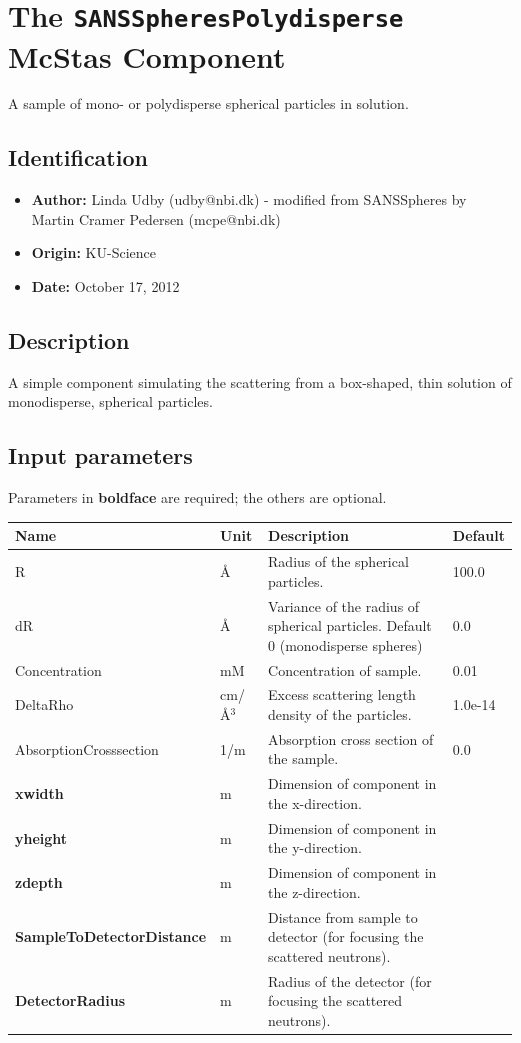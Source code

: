 \section{The \texttt{SANSSpheresPolydisperse} McStas Component}
A sample of mono- or polydisperse spherical particles in solution.

\subsection*{Identification}
\begin{itemize}
  \item \textbf{Author:} Linda Udby (udby@nbi.dk) - modified from SANSSpheres by Martin Cramer Pedersen (mcpe@nbi.dk)
  \item \textbf{Origin:} KU-Science
  \item \textbf{Date:} October 17, 2012
\end{itemize}

\subsection*{Description}
A simple component simulating the scattering from a box-shaped, thin solution of monodisperse, spherical particles.

\subsection*{Input parameters}
Parameters in \textbf{boldface} are required; the others are optional.

\begin{longtable}{p{}p{}p{}p{}}
\toprule
\textbf{Name} & \textbf{Unit} & \textbf{Description} & \textbf{Default} \\
\midrule
\endhead
R & \AA{} & Radius of the spherical particles. & 100.0 \\
dR & \AA{} & Variance of the radius of spherical particles. Default 0 (monodisperse spheres) & 0.0 \\
Concentration & mM & Concentration of sample. & 0.01 \\
DeltaRho & cm/\AA{}$^{3}$ & Excess scattering length density of the particles. & 1.0e-14 \\
AbsorptionCrosssection & 1/m & Absorption cross section of the sample. & 0.0 \\
\textbf{xwidth} & m & Dimension of component in the x-direction. &  \\
\textbf{yheight} & m & Dimension of component in the y-direction. &  \\
\textbf{zdepth} & m & Dimension of component in the z-direction. &  \\
\textbf{SampleToDetectorDistance} & m & Distance from sample to detector (for focusing the scattered neutrons). &  \\
\textbf{DetectorRadius} & m & Radius of the detector (for focusing the scattered neutrons). &  \\
\bottomrule
\end{longtable}


